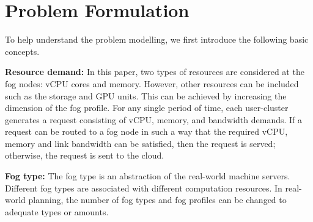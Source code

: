 \documentclass[10pt,journal,compsoc]{IEEEtran}
\begin{document}
\section{Problem Formulation}\label{probfor}
To help understand the problem modelling, we first introduce the following basic concepts.



\textbf{Resource demand: }In this paper, two types of resources are considered at the fog nodes: vCPU cores and memory. 
However, other resources can be included such as the storage and GPU units. This can be achieved by increasing the dimension of the fog profile. For any single period of time, each user-cluster generates a request consisting of vCPU, memory, and bandwidth demands. If a request can be routed to a fog node in such a way that the required vCPU, memory and link bandwidth can be satisfied, then the request is served; otherwise, the request is sent to the cloud. 

\textbf{Fog type: }The fog type is an abstraction of the real-world machine servers. Different fog types are associated with different computation resources. In real-world planning, the number of fog types and fog profiles can be changed to adequate types or amounts.
\end{document}
